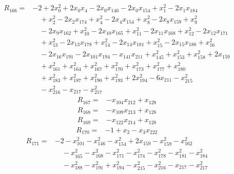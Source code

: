 \begin{equation*}\begin{split}
R_{166}={}&-2 + 2x_{0}^{2} + 2x_{0} x_{4} - 2x_{0} x_{146} - 2x_{0} x_{154} + x_{1}^{2} - 2x_{1} x_{184}\\
&\quad + x_{2}^{2} - 2x_{2} x_{174} + x_{4}^{2} - 2x_{4} x_{154} + x_{8}^{2} - 2x_{8} x_{159} + x_{9}^{2}\\
&\quad -2x_{9} x_{162} + x_{10}^{2} - 2x_{10} x_{165} + x_{11}^{2} - 2x_{11} x_{168} + x_{12}^{2} - 2x_{12} x_{171}\\
&\quad + x_{13}^{2} - 2x_{13} x_{178} + x_{14}^{2} - 2x_{14} x_{181} + x_{15}^{2} - 2x_{15} x_{188} + x_{16}^{2}\\
&\quad -2x_{16} x_{191} - 2x_{101} x_{194} - x_{141} x_{211} + x_{145}^{2} + x_{153}^{2} + x_{158}^{2} + 2x_{159}\\
&\quad + x_{161}^{2} + x_{164}^{2} + x_{167}^{2} + x_{170}^{2} + x_{173}^{2} + x_{177}^{2} + x_{180}^{2}\\
&\quad + x_{183}^{2} + x_{187}^{2} + x_{190}^{2} + x_{193}^{2} + 2x_{194}^{2} - 6x_{211} - x_{215}^{2}\\
&\quad -x_{216}^{2} - x_{217} - x_{217}^{2}
\end{split}\end{equation*}
\begin{equation*}\begin{split}
R_{167}={}&-x_{104} x_{212} + x_{128}
\end{split}\end{equation*}
\begin{equation*}\begin{split}
R_{168}={}&-x_{109} x_{213} + x_{128}
\end{split}\end{equation*}
\begin{equation*}\begin{split}
R_{169}={}&-x_{122} x_{214} + x_{128}
\end{split}\end{equation*}
\begin{equation*}\begin{split}
R_{170}={}&-1 + x_{2} - x_{3} x_{222}
\end{split}\end{equation*}
\begin{equation*}\begin{split}
R_{171}={}&-2 - x_{101}^{2} - x_{146}^{2} - x_{154}^{2} + 2x_{159} - x_{159}^{2} - x_{162}^{2}\\
&\quad -x_{165}^{2} - x_{168}^{2} - x_{171}^{2} - x_{174}^{2} - x_{178}^{2} - x_{181}^{2} - x_{184}^{2}\\
&\quad -x_{188}^{2} - x_{191}^{2} + x_{194}^{2} - x_{215}^{2} - x_{216}^{2} - x_{217} - x_{217}^{2}
\end{split}\end{equation*}
